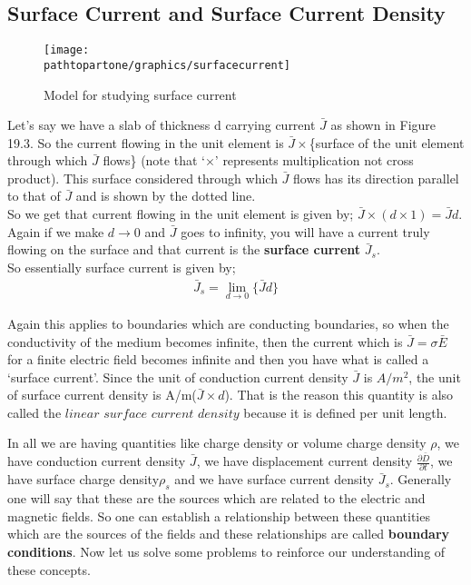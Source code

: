 \subsection{Surface Current and Surface Current Density}
\begin{figure}[h]
\centering
\texttt{[image: \\pathtopartone/graphics/surfacecurrent]}
\caption{Model for studying surface current}
\end{figure} 


Let's say we have a slab of thickness d carrying current $\bar{J}$ as shown in Figure 19.3. So the current flowing in the unit element is $\bar{J}\times$\{surface of the unit element through which $\bar{J}$ flows\} (note that `$\times$' represents multiplication not cross product).
This surface considered through which $\bar{J}$ flows has its direction parallel to that of $\bar{J}$ and is shown by the dotted line.\\ 
So we get that current flowing in the unit element is given by; $\bar{J}\times(d\times1)=\bar{J}d$. Again if we make $d\rightarrow0$ and $\bar{J}$ goes to infinity, you will have a current truly flowing on the surface and that current is the \textbf{surface current} $\bar{J}_{s}$. \\
So essentially surface current is given by;
\begin{align}
\bar{J}_{s}=\lim_{d\rightarrow0}\{\bar{J}d\}
\end{align}


Again this applies to boundaries which are conducting boundaries, so when the conductivity of the medium becomes infinite, then the current which is $\bar{J}=\sigma\bar{E}$ for a finite electric field becomes infinite and then you have what is called a `surface current'. Since the unit of conduction current density $\bar{J}$ is $A/m^{2}$, the unit of surface current density is A/m($\bar{J}\times d$). That is the reason this quantity is also called the $linear$ $surface$ $current$ $density$ because it is defined per unit length.


In all we are having quantities like charge density or volume charge density $\rho$, we have conduction current density $\bar{J}$, we have displacement current density $\frac{\partial\bar{D}}{\partial t}$, we have surface charge density$\rho_{s}$ and we have surface current density $\bar{J}_{s}$. Generally one will say that these are the sources which are related to the electric and magnetic fields. So one can establish a relationship between these quantities which are the sources of the fields and these relationships are called \textbf{ boundary conditions}. Now let us solve some problems to reinforce our understanding of these concepts.

